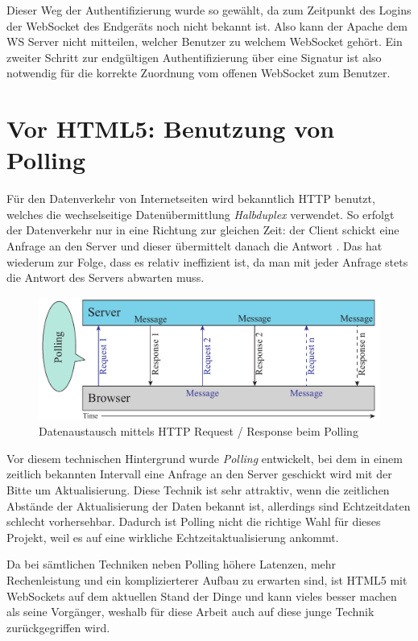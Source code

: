 Dieser Weg der Authentifizierung wurde so gewählt, da zum Zeitpunkt des Logins der WebSocket des Endgeräts noch nicht bekannt ist. Also kann der Apache dem WS Server nicht mitteilen, welcher Benutzer zu welchem WebSocket gehört. Ein zweiter Schritt zur endgültigen Authentifizierung über eine Signatur ist also notwendig für die korrekte Zuordnung vom offenen WebSocket zum Benutzer. 


\section{Vor HTML5: Benutzung von Polling}
Für den Datenverkehr von Internetseiten wird bekanntlich HTTP benutzt, welches die wechselseitige Datenübermittlung \emph{Halbduplex} verwendet. So erfolgt der Datenverkehr nur in eine Richtung zur gleichen Zeit: der Client schickt eine Anfrage an den Server und dieser übermittelt danach die Antwort \cite[S. 5]{ws}. Das hat wiederum zur Folge, dass es relativ ineffizient ist, da man mit jeder Anfrage stets die Antwort des Servers abwarten muss.\par

\begin{figure}[!ht]
	\centering
	\includegraphics[width=15cm]{fig/polling}
	\caption[Datenaustausch beim Polling]{Datenaustausch mittels HTTP Request / Response beim Polling {\cite[S. 7]{ws}}}
\end{figure}

Vor diesem technischen Hintergrund wurde \emph{Polling} entwickelt, bei dem in einem zeitlich bekannten Intervall eine Anfrage an den Server geschickt wird mit der Bitte um Aktualisierung. Diese Technik ist sehr attraktiv, wenn die zeitlichen Abstände der Aktualisierung der Daten bekannt ist, allerdings sind Echtzeitdaten schlecht vorhersehbar. Dadurch ist Polling nicht die richtige Wahl für dieses Projekt, weil es auf eine wirkliche Echtzeitaktualisierung ankommt.\par

Da bei sämtlichen Techniken neben Polling höhere Latenzen, mehr Rechenleistung und ein komplizierterer Aufbau zu erwarten sind, ist HTML5 mit WebSockets auf dem aktuellen Stand der Dinge und kann vieles besser machen als seine Vorgänger, weshalb für diese Arbeit auch auf diese junge Technik zurückgegriffen wird.